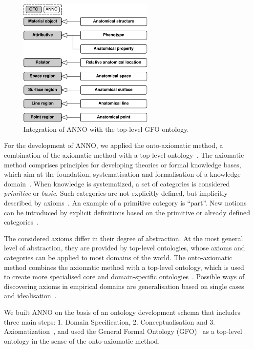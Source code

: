 \documentclass[sw]{iosart2x}
\begin{document}
\fi
\begin{figure}[h]
\includegraphics[width=0.6\textwidth]{img/gfo.pdf}
\caption{Integration of ANNO with the top-level GFO ontology.}\label{fig:gfo}
\end{figure}

For the development of ANNO, we applied the onto-axiomatic method, a combination of the axiomatic method with a top-level ontology~\citep{baumann2014, herre2010}.
The axiomatic method comprises principles for developing theories or formal knowledge bases, which aim at the foundation, systematisation and formalisation of a knowledge domain~\citep{baumann2014, herre2010}.
When knowledge is systematized, a set of categories is considered \emph{primitive} or \emph{basic}.
Such categories are not explicitly defined, but implicitly described by axioms~\citep{Hilbert1918}.
An example of a primitive category is \enquote{part}.
New notions can be introduced by explicit definitions based on the primitive or already defined categories~\citep{herre2010}.

The considered axioms differ in their degree of abstraction.
At the most general level of abstraction, they are provided by top-level ontologies, whose axioms and categories can be applied to most domains of the world.
The onto-axiomatic method combines the axiomatic method with a top-level ontology, which is used to create more specialised core and domain-specific ontologies~\citep{baumann2014}.
Possible ways of discovering axioms in empirical domains are generalisation based on single cases and idealisation~\citep{baumann2011}.

We built ANNO on the basis of an ontology development schema that includes three main steps: 1. Domain Specification, 2. Conceptualisation and 3. Axiomatization~\citep{herre2010}, and used the General Formal Ontology (GFO)~\citep{Loebe2022, Burek2020, herre2010} as a top-level ontology in the sense of the onto-axiomatic method.
\end{document}
